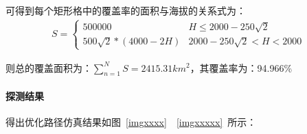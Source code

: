 \documentclass{whutmod}
\begin{document}
	可得到每个矩形格中的覆盖率的面积与海拔的关系式为：
	\begin{gather}
	S=\left\{\begin{matrix}
	500000& H\leqslant 2000-250\sqrt{2}\\ 
	500\sqrt{2}*(4000-2H) & 2000-250\sqrt{2}<H<2000
	\end{matrix}\right.
	\end{gather}
	
	则总的覆盖面积为：$\sum_{n=1}^{N}S=2415.31km^{2}$，其覆盖率为：94.966\%
	
	
	
	\paragraph{探测结果}得出优化路径仿真结果如图~\ref{imgxxxx}~~\ref{imgxxxxx}~所示：
	
	\begin{figure} [H]
		\centering 
		\quad
				\quad
		\quad
	\end{figure}
\end{document}
